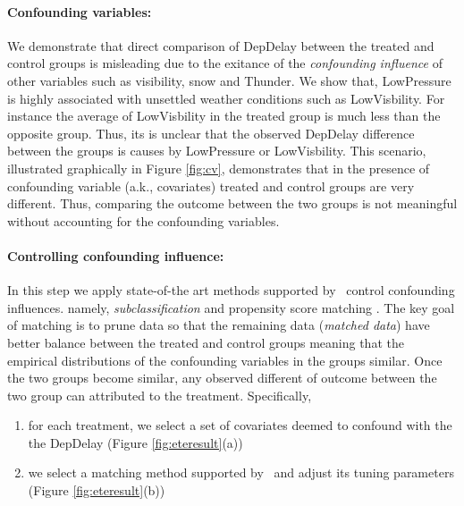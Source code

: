  \paragraph{\bf Confounding variables:} We demonstrate that direct comparison of DepDelay between the treated and control groups is misleading due to the exitance of the  {\em  confounding influence} of other variables such as visibility, snow and Thunder.  We show that, LowPressure is highly associated with unsettled weather conditions such as LowVisbility. For instance the average of LowVisbility in the treated group is much less than
  the opposite group. Thus, its is unclear that the observed DepDelay difference between the groups is causes by LowPressure or LowVisbility. This scenario, illustrated graphically in Figure \ref{fig:cv}, demonstrates that in the presence of confounding variable (a.k., covariates) treated and control groups are very different. Thus, comparing the outcome between the two groups is not meaningful without accounting for the confounding variables.


 \paragraph{\bf Controlling confounding influence:}
In this step we apply state-of-the art methods supported by \GSQL\ control confounding influences. 
namely,  {\em subclassification} and {propensity score matching} \cite{Rubin1983b,IacKinPor09,rosenbaum1984reducing}.
The key goal of matching is to prune data so that
the remaining data ({\em matched data}) have better balance between the treated and control groups meaning that the empirical distributions of the confounding variables in the groups  similar. Once the two groups become similar, any observed different of outcome between the two group can attributed to the treatment. Specifically,
     \begin{enumerate}
      \item for each treatment, we select a set of covariates deemed to confound with the the DepDelay (Figure \ref{fig:eteresult}(a))
      \item we select a matching method supported by \GSQL\ and adjust its tuning parameters (Figure \ref{fig:eteresult}(b))
\end{enumerate}

